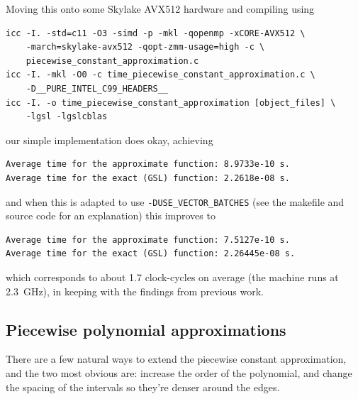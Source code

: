 \documentclass[11pt,a4paper,twoside,english]{extarticle}
\begin{document}
Moving this onto some \intel Skylake AVX512 hardware and compiling using 
\begin{verbatim}
icc -I. -std=c11 -O3 -simd -p -mkl -qopenmp -xCORE-AVX512 \
    -march=skylake-avx512 -qopt-zmm-usage=high -c \
    piecewise_constant_approximation.c 
icc -I. -mkl -O0 -c time_piecewise_constant_approximation.c \
    -D__PURE_INTEL_C99_HEADERS__
icc -I. -o time_piecewise_constant_approximation [object_files] \
    -lgsl -lgslcblas
\end{verbatim}
our simple implementation does okay, achieving
\begin{verbatim}
Average time for the approximate function: 8.9733e-10 s.
Average time for the exact (GSL) function: 2.2618e-08 s.
\end{verbatim}
and when this is adapted to use \verb|-DUSE_VECTOR_BATCHES| (see the makefile and source code for an explanation) this improves to
\begin{verbatim}
Average time for the approximate function: 7.5127e-10 s.
Average time for the exact (GSL) function: 2.26445e-08 s.
\end{verbatim}
which corresponds to about 1.7 clock-cycles on average (the machine runs at \SI{2.3}{\giga\hertz}), in keeping with the findings from previous work. 



\subsection{Piecewise polynomial approximations}


There are a few natural ways to extend the piecewise constant approximation, and the two most obvious are: increase the order of the polynomial, and change the spacing of the intervals so they're denser around the edges. 
\end{document}
